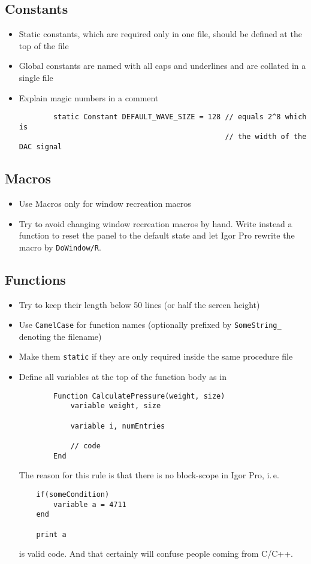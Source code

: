 \documentclass{scrartcl}
\begin{document}
\subsection{Constants}
%
\begin{itemize}
	\item Static constants, which are required only in one file, should be defined at the top of the file
%
	\item Global constants are named with all caps and underlines and are collated in a single file
%
	\item Explain magic numbers in a comment
	\begin{verbatim}
		static Constant DEFAULT_WAVE_SIZE = 128 // equals 2^8 which is
		                                        // the width of the DAC signal
	\end{verbatim}
\end{itemize}
%
\subsection{Macros}
\begin{itemize}
	\item Use Macros only for window recreation macros
%
	\item Try to avoid changing window recreation macros by hand. Write instead a function to reset the panel to 
	      the default state and let Igor Pro rewrite the macro by \texttt{DoWindow/R}.
\end{itemize}
%
\subsection{Functions}
\begin{itemize}
	\item Try to keep their length below 50 lines (or half the screen height)
%	
	\item Use \texttt{CamelCase} for function names (optionally prefixed by \texttt{SomeString_} denoting the filename)
%	
	\item Make them \texttt{static} if they are only required inside the same procedure file
%	
	\item Define all variables at the top of the function body as in
	\begin{verbatim}
		Function CalculatePressure(weight, size)
			variable weight, size
			
			variable i, numEntries
			
			// code
		End
	\end{verbatim}
	The reason for this rule is that there is no block-scope in Igor Pro, i.\,e.
	\begin{verbatim}
	if(someCondition)
		variable a = 4711
	end
	
	print a
	\end{verbatim}
	is valid code. And that certainly will confuse people coming from C/C++.
\end{itemize}
%
\end{document}
